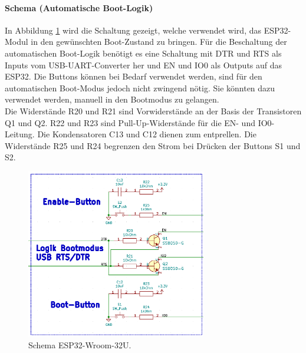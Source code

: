 
\paragraph{Schema (Automatische Boot-Logik)}\mbox{}

In Abbildung \ref{fig:Schema_ESP32_Flashbuttons} wird die Schaltung gezeigt, welche verwendet wird, das ESP32-Modul in den gewünschten Boot-Zustand zu bringen. Für die Beschaltung der automatischen Boot-Logik benötigt es eine Schaltung mit DTR und RTS als Inputs vom USB-UART-Converter her und EN und IO0 als Outputs auf das ESP32. Die Buttons können bei Bedarf verwendet werden, sind für den automatischen Boot-Modus jedoch nicht zwingend nötig. Sie könnten dazu verwendet werden, manuell in den Bootmodus zu gelangen.\\
Die Widerstände R20 und R21 sind Vorwiderstände an der Basis der Transistoren Q1 und Q2. R22 und R23 sind Pull-Up-Widerstände für die EN- und IO0-Leitung. Die Kondensatoren C13 und C12 dienen zum entprellen. Die Widerstände R25 und R24 begrenzen den Strom bei Drücken der Buttons S1 und S2.

\begin{figure}[H]
	\centering
	\includegraphics[width=0.7\textwidth]{graphics/Schema_ESP32_Flashbuttons}
	\caption{Schema ESP32-Wroom-32U.}
	\label{fig:Schema_ESP32_Flashbuttons}
\end{figure}

